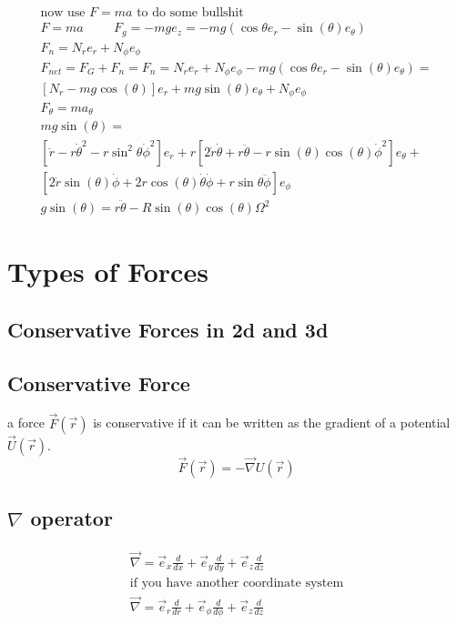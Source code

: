 \documentclass[fleqn]{report}
\newcommand{\hp}{\hspace{1cm}}
\newcommand{\equations} [1] {
\begin{gather*}
#1
\end{gather*}
}
\begin{document}
\equations{
    \textrm{now use $F = ma$ to do some bullshit}
    \\
    F = ma \hp F_g = -mg e_z = 
    -mg (\cos \theta e_r - \sin(\theta) e_\theta )
    \\
    F_n = N_r e_r + N_\phi e_\phi
    \\
    F_{net} = F_G + F_n = 
    F_n = N_r e_r + N_\phi e_\phi
    -mg (\cos \theta e_r - \sin(\theta) e_\theta )
    = \\
    [N_r - mg \cos(\theta)] e_r +
    mg \sin (\theta) e_\theta + 
    N_\phi e_\phi
    \\
    F_\theta = m a_\theta
    \\
    mg \sin(\theta) = \\
    [\ddot r - r \dot \theta^2 - 
    r \sin^2 \theta \dot \phi^2] e_r 
    +
    r[2 \dot r \dot \theta + r \ddot \theta  - 
    r \sin(\theta) \cos(\theta) \dot \phi^2] e_\theta 
    + \\
    [2\dot r \sin(\theta) \dot \phi + 
    2 r \cos(\theta) \dot \theta \dot \phi +
    r \sin \theta \ddot \phi] e_\phi
    \\
    g \sin(\theta) = r \ddot \theta -
    R \sin(\theta) \cos (\theta) \Omega^2
}

\section{Types of Forces}

\subsection{Conservative Forces in 2d and 3d}

\subsection{Conservative Force}
a force $\vec F( \vec r)$ is conservative if it can be written 
as the gradient of a potential $\vec U(\vec r)$.
\[
\vec F(\vec r) = - \vec \nabla U(\vec r)
\]

\subsection{$\nabla$ operator}
\equations{
    \vec \nabla =
    \vec e_x \frac{d}{dx} +
    \vec e_y \frac{d}{dy} +
    \vec e_z \frac{d}{dz}
    \\
    \textrm{if you have another coordinate system}
    \\
    \vec \nabla =
    \vec e_r \frac{d}{dr} +
    \vec e_\phi \frac{d}{d\phi} +
    \vec e_z \frac{d}{dz}
}
\end{document}
